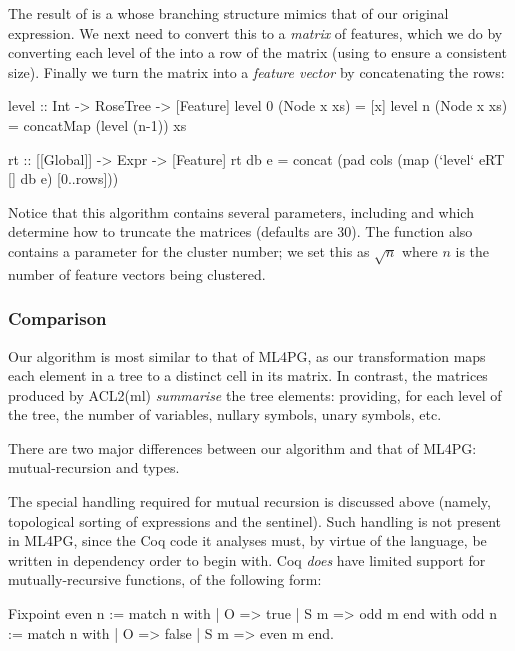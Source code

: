 The result of  is a  whose branching structure mimics that of our original expression. We next need to convert this to a \emph{matrix} of features, which we do by converting each level of the  into a row of the matrix (using  to ensure a consistent size). Finally we turn the matrix into a \emph{feature vector} by concatenating the rows:

\begin{haskell}
level :: Int -> RoseTree -> [Feature]
level 0 (Node x xs) = [x]
level n (Node x xs) = concatMap (level (n-1)) xs

rt :: [[Global]] -> Expr -> [Feature]
rt db e = concat (pad cols (map (`level` eRT [] db e) [0..rows]))
\end{haskell}

Notice that this algorithm contains several parameters, including  and  which determine how to truncate the matrices (defaults are 30). The  function also contains a parameter for the cluster number; we set this as $\sqrt{n}$ where $n$ is the number of feature vectors being clustered.

\subsubsection{Comparison}

Our algorithm is most similar to that of ML4PG, as our transformation maps each element in a tree to a distinct cell in its matrix. In contrast, the matrices produced by ACL2(ml) \emph{summarise} the tree elements: providing, for each level of the tree, the number of variables, nullary symbols, unary symbols, etc.

There are two major differences between our algorithm and that of ML4PG: mutual-recursion and types.

The special handling required for mutual recursion is discussed above (namely, topological sorting of expressions and the  sentinel). Such handling is not present in ML4PG, since the Coq code it analyses must, by virtue of the language, be written in dependency order to begin with. Coq \emph{does} have limited support for mutually-recursive functions, of the following form:

\begin{coqblock}
Fixpoint even n := match n with
                       | O   => true
                       | S m => odd m
                   end
    with odd  n := match n with
                       | O   => false
                       | S m => even m
                   end.
\end{coqblock}

